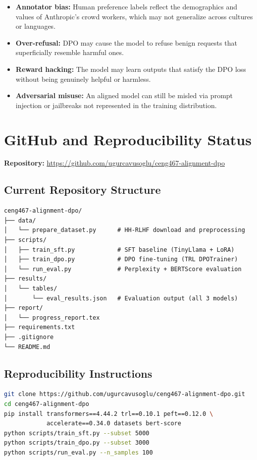 \documentclass[12pt,a4paper]{article}
\begin{document}
\begin{itemize}[noitemsep]
    \item \textbf{Annotator bias:} Human preference labels reflect the demographics
          and values of Anthropic's crowd workers, which may not generalize across
          cultures or languages.
    \item \textbf{Over-refusal:} DPO may cause the model to refuse benign requests
          that superficially resemble harmful ones.
    \item \textbf{Reward hacking:} The model may learn outputs that satisfy the DPO
          loss without being genuinely helpful or harmless.
    \item \textbf{Adversarial misuse:} An aligned model can still be misled via prompt
          injection or jailbreaks not represented in the training distribution.
\end{itemize}

\section{GitHub and Reproducibility Status}

\textbf{Repository:} \url{https://github.com/ugurcavusoglu/ceng467-alignment-dpo}

\subsection*{Current Repository Structure}

\begin{lstlisting}
ceng467-alignment-dpo/
├── data/
│   └── prepare_dataset.py      # HH-RLHF download and preprocessing
├── scripts/
│   ├── train_sft.py            # SFT baseline (TinyLlama + LoRA)
│   ├── train_dpo.py            # DPO fine-tuning (TRL DPOTrainer)
│   └── run_eval.py             # Perplexity + BERTScore evaluation
├── results/
│   └── tables/
│       └── eval_results.json   # Evaluation output (all 3 models)
├── report/
│   └── progress_report.tex
├── requirements.txt
├── .gitignore
└── README.md
\end{lstlisting}

\subsection*{Reproducibility Instructions}

\begin{lstlisting}[language=bash]
git clone https://github.com/ugurcavusoglu/ceng467-alignment-dpo.git
cd ceng467-alignment-dpo
pip install transformers==4.44.2 trl==0.10.1 peft==0.12.0 \
            accelerate==0.34.0 datasets bert-score
python scripts/train_sft.py --subset 5000
python scripts/train_dpo.py --subset 3000
python scripts/run_eval.py --n_samples 100
\end{lstlisting}
\end{document}
